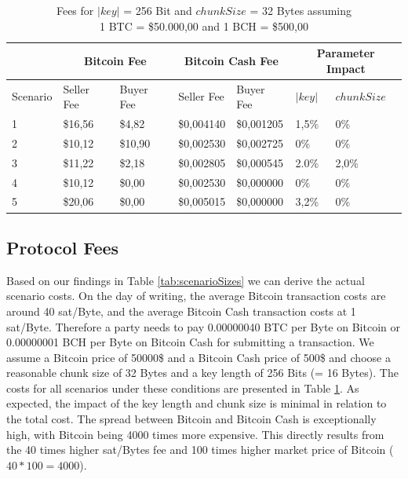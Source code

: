 \documentclass{cacthesis}
\begin{document}
        \begin{table}[]
        \centering
        \begin{tabular}{l|l|l|l|l|l|l}
                 & \multicolumn{2}{c|}{Bitcoin Fee} & \multicolumn{2}{c|}{Bitcoin Cash Fee} & \multicolumn{2}{c}{Parameter Impact} \\ \hline
        Scenario & Seller Fee      & Buyer Fee      & Seller Fee        & Buyer Fee         & $|key|$            & $chunkSize$            \\ \hline
        1        & \$16,56         & \$4,82         & \$0,004140        & \$0,001205        & 1,5\%              & 0\%                    \\ 
        2        & \$10,12         & \$10,90        & \$0,002530        & \$0,002725        & 0\%                & 0\%                    \\ 
        3        & \$11,22         & \$2,18         & \$0,002805        & \$0,000545        & 2.0\%              & 2,0\%                  \\ 
        4        & \$10,12         & \$0,00         & \$0,002530        & \$0,000000        & 0\%                & 0\%                    \\ 
        5        & \$20,06         & \$0,00         & \$0,005015        & \$0,000000        & 3,2\%              & 0\%                   
        \end{tabular}
        \caption{\centering Fees for $|key|$ = 256 Bit and $chunkSize$ = 32 Bytes assuming\\1 BTC = \$50.000,00 and 1 BCH = \$500,00}
        \label{tab:feeExample}
        \end{table}
	    
	    \subsection{Protocol Fees}
        Based on our findings in Table \ref{tab:scenarioSizes} we can derive the actual scenario costs. On the day of writing, the average Bitcoin transaction costs are around 40 sat/Byte, and the average Bitcoin Cash transaction costs at 1 sat/Byte. Therefore a party needs to pay 0.00000040 BTC per Byte on Bitcoin or 0.00000001 BCH per Byte on Bitcoin Cash for submitting a transaction. We assume a Bitcoin price of 50000\$ and a Bitcoin Cash price of 500\$ and choose a reasonable chunk size of 32 Bytes and a key length of 256 Bits (= 16 Bytes). The costs for all scenarios under these conditions are presented in Table \ref{tab:feeExample}. As expected, the impact of the key length and chunk size is minimal in relation to the total cost. The spread between Bitcoin and Bitcoin Cash is exceptionally high, with Bitcoin being 4000 times more expensive. This directly results from the 40 times higher sat/Bytes fee and 100 times higher market price of Bitcoin ($40 * 100 = 4000$).
	    
\end{document}

